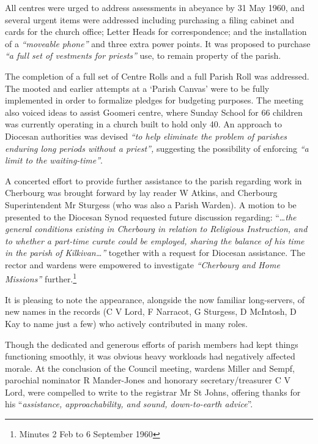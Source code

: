 All centres were urged to address assessments in abeyance by 31 May 1960, and several urgent items were addressed including purchasing a filing cabinet and cards for the church office; Letter Heads for correspondence; and the installation of a \emph{``moveable phone''} and three extra power points. It was proposed to purchase \emph{``a full set of vestments for priests''} use, to remain property of the parish.



The completion of a full set of Centre Rolls and a full Parish Roll was addressed. The mooted and earlier attempts at a `Parish Canvas' were to be fully implemented in order to formalize pledges for budgeting purposes. The meeting also voiced ideas to assist Goomeri centre, where Sunday School for 66 children was currently operating in a church built to hold only 40. An approach to Diocesan authorities was devised \emph{``to help eliminate the problem of parishes enduring long periods without a priest'',} suggesting the possibility of enforcing \emph{``a limit to the waiting-time''}.



A concerted effort to provide further assistance to the parish regarding work in Cherbourg was brought forward by lay reader W Atkins, and Cherbourg Superintendent Mr Sturgess (who was also a Parish Warden). A motion to be presented to the Diocesan Synod requested future discussion regarding: ``\ldots{}\emph{the general conditions existing in Cherbourg in relation to Religious Instruction, and to whether a part-time curate could be employed, sharing the balance of his time in the parish of Kilkivan\ldots''} together with a request for Diocesan assistance. The rector and wardens were empowered to investigate \emph{``Cherbourg and Home Missions''} further.\footnote{Minutes 2 Feb to 6 September 1960}


It is pleasing to note the appearance, alongside the now familiar long-servers, of new names in the records (C V Lord, F Narracot, G Sturgess, D McIntosh, D Kay to name just a few) who actively contributed in many roles.



Though the dedicated and generous efforts of parish members had kept things functioning smoothly, it was obvious heavy workloads had negatively affected morale. At the conclusion of the Council meeting, wardens Miller and Sempf, parochial nominator R Mander-Jones and honorary secretary/treasurer C V Lord, were compelled to write to the registrar Mr St Johns, offering thanks for his ``\emph{assistance, approachability, and sound, down-to-earth advice}''.



